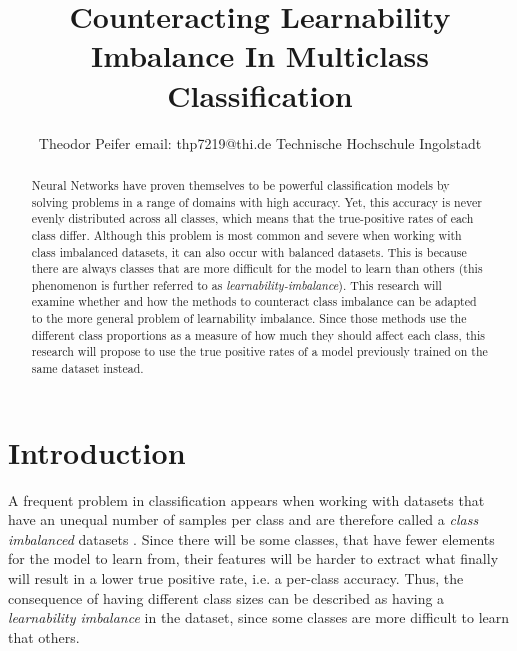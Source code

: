 \documentclass[journal]{IEEEtran}
\begin{document}
 

\title{\textbf{Counteracting Learnability Imbalance In Multiclass Classification}}

\author{Theodor Peifer
        \linebreak
        email: thp7219@thi.de
        \linebreak
        Technische Hochschule Ingolstadt
}

\maketitle

\begin{abstract}
Neural Networks have proven themselves to be powerful classification
models by solving problems in a range of domains with high accuracy.
Yet, this accuracy is never evenly distributed across all classes, which means that the true-positive rates of each class differ.
Although this problem is most common and severe when working with class imbalanced datasets, it can also occur with balanced datasets.
This is because there are always classes that are more difficult for the model to learn than others (this phenomenon is further referred to as \emph{learnability-imbalance}).
This research will examine whether and how the methods to counteract class imbalance can be adapted to the more general problem of learnability imbalance.
Since those methods use the different class proportions as a measure of how much they should affect each class, this research will propose
to use the true positive rates of a model previously trained on the same dataset instead.

\end{abstract}


\section{Introduction}
A frequent problem in classification appears when working with datasets that have an unequal number of samples per class and are therefore called a \emph{class imbalanced} datasets \cite{japkowicz2002class}.
Since there will be some classes, that have fewer elements for the model to learn from, their features will be harder to extract what finally will result in a lower true positive rate, i.e. a per-class accuracy.
Thus, the consequence of having different class sizes can be described as having a \emph{learnability imbalance} in the dataset, since some classes are more difficult to learn that others.
\end{document}
